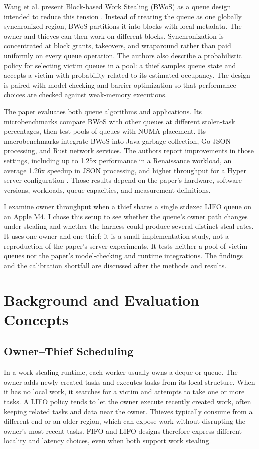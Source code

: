 \documentclass[conference]{IEEEtran}
\begin{document}
Wang et al. present Block-based Work Stealing (BWoS) as a queue design intended to reduce this tension \cite{wang2023bwos}. Instead of treating the queue as one globally synchronized region, BWoS partitions it into blocks with local metadata. The owner and thieves can then work on different blocks. Synchronization is concentrated at block grants, takeovers, and wraparound rather than paid uniformly on every queue operation. The authors also describe a probabilistic policy for selecting victim queues in a pool: a thief samples queue state and accepts a victim with probability related to its estimated occupancy. The design is paired with model checking and barrier optimization so that performance choices are checked against weak-memory executions.

The paper evaluates both queue algorithms and applications. Its microbenchmarks compare BWoS with other queues at different stolen-task percentages, then test pools of queues with NUMA placement. Its macrobenchmarks integrate BWoS into Java garbage collection, Go JSON processing, and Rust network services. The authors report improvements in those settings, including up to 1.25x performance in a Renaissance workload, an average 1.26x speedup in JSON processing, and higher throughput for a Hyper server configuration \cite{wang2023bwos}. Those results depend on the paper's hardware, software versions, workloads, queue capacities, and measurement definitions.

I examine owner throughput when a thief shares a single stdexec LIFO queue on an Apple M4. I chose this setup to see whether the queue's owner path changes under stealing and whether the harness could produce several distinct steal rates. It uses one owner and one thief; it is a small implementation study, not a reproduction of the paper's server experiments. It tests neither a pool of victim queues nor the paper's model-checking and runtime integrations. The findings and the calibration shortfall are discussed after the methods and results.

\section{Background and Evaluation Concepts}
\subsection{Owner--Thief Scheduling}
In a work-stealing runtime, each worker usually owns a deque or queue. The owner adds newly created tasks and executes tasks from its local structure. When it has no local work, it searches for a victim and attempts to take one or more tasks. A LIFO policy tends to let the owner execute recently created work, often keeping related tasks and data near the owner. Thieves typically consume from a different end or an older region, which can expose work without disrupting the owner's most recent tasks. FIFO and LIFO designs therefore express different locality and latency choices, even when both support work stealing.
\end{document}
